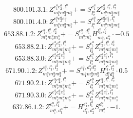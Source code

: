 \documentclass[letterpaper,10pt,fleqn,leqno,onecolumn]{article}
\begin{document}
\begin{equation} \;\;\;\;\;\;  800.101.3.1: Z^{e_{1}^{a}e_{2}^{a},l_{1}^{a}}_{m_{1}^{a}m_{2}^{a}m_{3}^{a}}+=S^{e_{1}^{a}}_{l_{2}^{a}}Z^{e_{2}^{a},l_{1}^{a},l_{2}^{a}}_{m_{1}^{a}m_{2}^{a}m_{3}^{a}} \end{equation}
\begin{equation} \;\;\;\;\;\;  800.101.4.0: Z^{e_{1}^{a}e_{2}^{a}e_{3}^{a}}_{m_{1}^{a}m_{2}^{a}m_{3}^{a}}+=S^{e_{1}^{a}}_{l_{1}^{a}}Z^{e_{2}^{a}e_{3}^{a},l_{1}^{a}}_{m_{1}^{a}m_{2}^{a}m_{3}^{a}} \end{equation}
\begin{equation} \;\;\;\;\;\;  653.88.1.2: Z^{e_{1}^{a},l_{1}^{a},l_{2}^{a}}_{m_{1}^{a}m_{2}^{a}m_{3}^{a}}+=S^{e_{1}^{a},d_{1}^{a}}_{m_{1}^{a}m_{2}^{a}}H^{l_{1}^{a},l_{2}^{a}}_{m_{3}^{a},d_{1}^{a}}\cdot -0.5 \end{equation}
\begin{equation} \;\;\;\;\;\;  653.88.2.1: Z^{e_{1}^{a}e_{2}^{a},l_{1}^{a}}_{m_{1}^{a}m_{2}^{a}m_{3}^{a}}+=S^{e_{1}^{a}}_{l_{2}^{a}}Z^{e_{2}^{a},l_{1}^{a},l_{2}^{a}}_{m_{1}^{a}m_{2}^{a}m_{3}^{a}} \end{equation}
\begin{equation} \;\;\;\;\;\;  653.88.3.0: Z^{e_{1}^{a}e_{2}^{a}e_{3}^{a}}_{m_{1}^{a}m_{2}^{a}m_{3}^{a}}+=S^{e_{1}^{a}}_{l_{1}^{a}}Z^{e_{2}^{a}e_{3}^{a},l_{1}^{a}}_{m_{1}^{a}m_{2}^{a}m_{3}^{a}} \end{equation}
\begin{equation} \;\;\;\;\;\;  671.90.1.2: Z^{e_{1}^{a},l_{1}^{a},l_{2}^{a}}_{m_{1}^{a}m_{2}^{a}m_{3}^{a}}+=S^{e_{1}^{a},d_{1}^{a}d_{2}^{a}}_{m_{1}^{a}m_{2}^{a}m_{3}^{a}}H^{l_{1}^{a},l_{2}^{a}}_{d_{1}^{a}d_{2}^{a}}\cdot 0.5 \end{equation}
\begin{equation} \;\;\;\;\;\;  671.90.2.1: Z^{e_{1}^{a}e_{2}^{a},l_{1}^{a}}_{m_{1}^{a}m_{2}^{a}m_{3}^{a}}+=S^{e_{1}^{a}}_{l_{2}^{a}}Z^{e_{2}^{a},l_{1}^{a},l_{2}^{a}}_{m_{1}^{a}m_{2}^{a}m_{3}^{a}} \end{equation}
\begin{equation} \;\;\;\;\;\;  671.90.3.0: Z^{e_{1}^{a}e_{2}^{a}e_{3}^{a}}_{m_{1}^{a}m_{2}^{a}m_{3}^{a}}+=S^{e_{1}^{a}}_{l_{1}^{a}}Z^{e_{2}^{a}e_{3}^{a},l_{1}^{a}}_{m_{1}^{a}m_{2}^{a}m_{3}^{a}} \end{equation}
\begin{equation} \;\;\;\;\;\;  637.86.1.2: Z^{e_{1}^{a},l_{1}^{a}}_{m_{1}^{a},d_{1}^{a}}+=H^{e_{1}^{a},l_{1}^{a}}_{d_{1}^{a},d_{2}^{a}}S^{d_{2}^{a}}_{m_{1}^{a}}\cdot -1. \end{equation}
\end{document}
